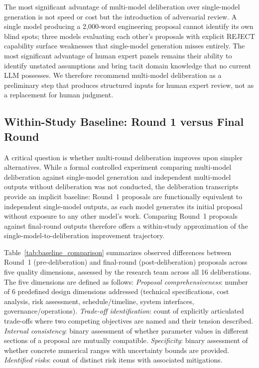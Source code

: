 \documentclass[11pt,a4paper]{article}
\begin{document}
The most significant advantage of multi-model deliberation over single-model generation is not speed or cost but the introduction of adversarial review. A single model producing a 2{,}000-word engineering proposal cannot identify its own blind spots; three models evaluating each other's proposals with explicit REJECT capability surface weaknesses that single-model generation misses entirely. The most significant advantage of human expert panels remains their ability to identify unstated assumptions and bring tacit domain knowledge that no current LLM possesses. We therefore recommend multi-model deliberation as a preliminary step that produces structured inputs for human expert review, not as a replacement for human judgment.

\subsection{Within-Study Baseline: Round 1 versus Final Round}
\label{sec:baseline}

A critical question is whether multi-round deliberation improves upon simpler alternatives. While a formal controlled experiment comparing multi-model deliberation against single-model generation and independent multi-model outputs without deliberation was not conducted, the deliberation transcripts provide an implicit baseline: Round~1 proposals are functionally equivalent to independent single-model outputs, as each model generates its initial proposal without exposure to any other model's work. Comparing Round~1 proposals against final-round outputs therefore offers a within-study approximation of the single-model-to-deliberation improvement trajectory.

Table~\ref{tab:baseline_comparison} summarizes observed differences between Round~1 (pre-deliberation) and final-round (post-deliberation) proposals across five quality dimensions, assessed by the research team across all 16 deliberations. The five dimensions are defined as follows: \emph{Proposal comprehensiveness}: number of 6 predefined design dimensions addressed (technical specifications, cost analysis, risk assessment, schedule/timeline, system interfaces, governance/operations). \emph{Trade-off identification}: count of explicitly articulated trade-offs where two competing objectives are named and their tension described. \emph{Internal consistency}: binary assessment of whether parameter values in different sections of a proposal are mutually compatible. \emph{Specificity}: binary assessment of whether concrete numerical ranges with uncertainty bounds are provided. \emph{Identified risks}: count of distinct risk items with associated mitigations.
\end{document}
